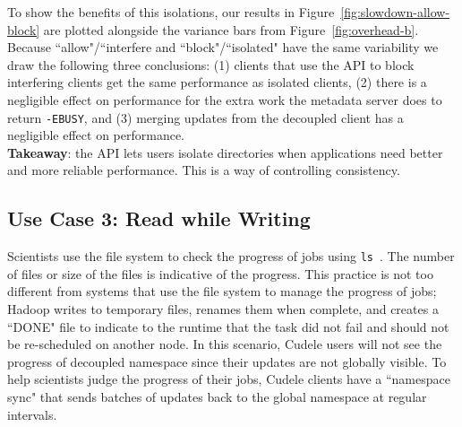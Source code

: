 To show the benefits of this isolations, our results in
Figure~\ref{fig:slowdown-allow-block} are plotted alongside the variance bars from
Figure~\ref{fig:overhead-b}. Because ``allow"/``interfere and
``block"/``isolated" have the same variability we draw the following three
conclusions: (1) clients that use the API to block interfering clients  get
the same performance as isolated clients, (2) there is a negligible effect on
performance for the extra work the metadata server does to return
\texttt{-EBUSY}, and (3) merging updates from the decoupled client has a
negligible effect on performance.\\

\noindent\textbf{Takeaway}: the API lets users isolate directories when
applications need better and more reliable performance. This is a way of
controlling consistency.

\subsection{Use Case 3: Read while Writing}

Scientists use the file system to check the progress of jobs using
\texttt{ls}~\cite{CITEME}. The number of files or size of the files is
indicative of the progress. This practice is not too different from systems
that use the file system to manage the progress of jobs; Hadoop writes to
temporary files, renames them when complete, and creates a ``DONE" file to
indicate to the runtime that the task did not fail and should not be
re-scheduled on another node. In this scenario, Cudele users will not see the
progress of decoupled namespace since their updates are not globally visible.
To help scientists judge the progress of their jobs, Cudele clients have a
``namespace sync" that sends batches of updates back to the global namespace at
regular intervals.

